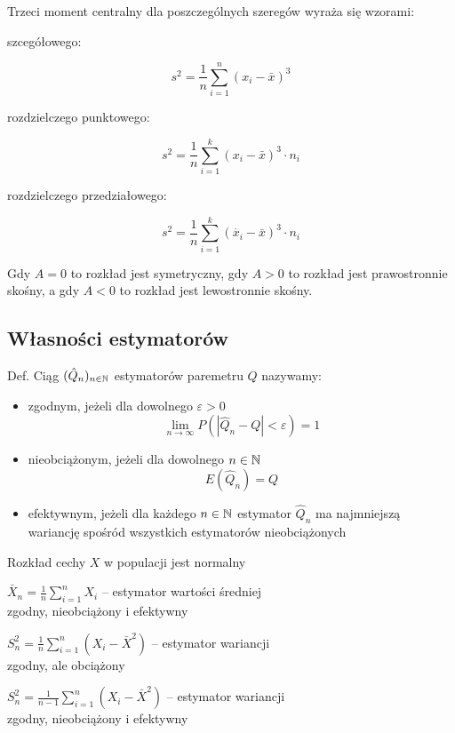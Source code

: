 \documentclass[../Matematyka.tex]{subfiles}
\begin{document}
Trzeci moment centralny dla poszczególnych szeregów wyraża się wzorami:
\begin{multicols}{3}
    \begin{center}szcegółowego:\end{center}
    \[s^2=\frac{1}{n}\sum_{i=1}^{n}(x_i - \bar{x})^3\]
    \begin{center}rozdzielczego punktowego:\end{center}
    \[s^2=\frac{1}{n}\sum_{i=1}^{k}(x_i - \bar{x})^3 \cdot n_i\]
    \begin{center}rozdzielczego przedziałowego:\end{center}
    \[s^2=\frac{1}{n}\sum_{i=1}^{k}(\dot{x_i} - \bar{x})^3 \cdot n_i\]
\end{multicols}

Gdy \(A = 0\) to rozkład jest symetryczny, gdy \(A > 0\) to rozkład jest prawostronnie skośny, a gdy \(A < 0\) to rozkład jest lewostronnie skośny.

\subsection{Własności estymatorów}

Def. Ciąg \((\hat{Q}_n)_{n\in\mathbb{N}}\) estymatorów paremetru \(Q\) nazywamy:
\begin{itemize}
    \item zgodnym, jeżeli dla dowolnego \(\varepsilon > 0\) \[\lim_{n\rightarrow\infty} P(|\hat{Q}_n - Q| < \varepsilon) = 1\]
    \item nieobciążonym, jeżeli dla dowolnego \(n \in \mathbb{N}\) \[E(\hat{Q}_n) = Q\]
    \item efektywnym, jeżeli dla każdego \(n \in \mathbb{N}\) estymator \(\hat{Q}_n\) ma najmniejszą wariancję spośród wszystkich estymatorów nieobciążonych
\end{itemize}

Rozkład cechy \(X\) w populacji jest normalny

\begin{center}
    \(\displaystyle{\bar{X}_n = \frac{1}{n}\sum_{i=1}^{n}X_i}\) -- estymator wartości średniej\\
    zgodny, nieobciążony i efektywny

    \(\displaystyle{S^2_n = \frac{1}{n}\sum_{i=1}^{n}(X_i-\bar{X}^2)}\) -- estymator wariancji\\
    zgodny, ale obciążony

    \(\displaystyle{S^2_n = \frac{1}{n-1}\sum_{i=1}^{n}(X_i-\bar{X}^2)}\) -- estymator wariancji\\
    zgodny, nieobciążony i efektywny
\end{center}
\end{document}
